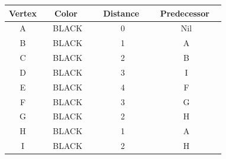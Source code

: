 \documentclass[12pt]{article}
\newcommand{\vs}{\vspace{2mm}}
\newcommand{\ls}{\vspace{5mm}}
\newcommand{\hs}{\hspace{10mm}}
\newcommand{\ha}{\hspace{1mm}}
\begin{document}

\begin{tabular}{|c|c|c|c|} \hline
  Vertex  & \hs\ \ha\  Color \hs\ \ha\ & \hs\  Distance \hs\ & \ha\ Predecessor \ha\  \\ \hline
  A & BLACK & 0 & Nil \\ \hline
  B & BLACK & 1 & A \\ \hline
  C & BLACK & 2 & B \\ \hline
  D & BLACK & 3 & I \\ \hline
  E & BLACK & 4 & F \\ \hline
  F & BLACK & 3 & G \\ \hline
  G & BLACK & 2 & H \\ \hline
  H & BLACK & 1 & A \\ \hline
  I & BLACK & 2 & H \\ \hline
\end{tabular}


\vs\
\ls\
\end{document}
